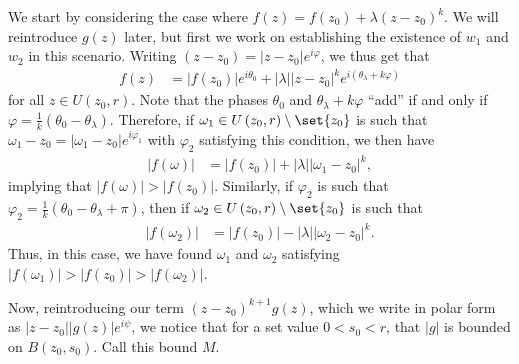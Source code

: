 \documentclass[10pt]{mypackage}
\begin{document}
\begin{solution}
\begin{enumerate}[(a)]
      We start by considering the case where $f(z) = f\left(z_0\right) + \lambda \left( z-z_0 \right)^{k}$. We will reintroduce $g(z)$ later, but first we work on establishing the existence of $w_1$ and $w_2$ in this scenario. Writing $\left( z-z_0 \right) = \left\vert z-z_0 \right\vert e^{i\varphi}$, we thus get that
      \begin{align*}
        f(z) &= \left\vert f\left( z_0 \right) \right\vert e^{i\theta_0} + \left\vert \lambda \right\vert \left\vert z-z_0 \right\vert^{k} e^{i\left( \theta_{\lambda} + k\varphi \right)}
      \end{align*}
      for all $z\in U\left( z_0,r \right)$. Note that the phases $\theta_0$ and $\theta_{\lambda} + k\varphi$ ``add'' if and only if $\varphi = \frac{1}{k} \left( \theta_{0} - \theta_{\lambda} \right)$. Therefore, if $\omega_1\in U\left( z_0,r \right)\setminus \set{z_0}$ is such that $\omega_1 - z_0 = \left\vert \omega_1 - z_0 \right\vert e^{i \varphi_1}$ with $\varphi_2$ satisfying this condition, we then have
      \begin{align*}
        \left\vert f\left( \omega \right) \right\vert &= \left\vert f\left( z_0 \right) \right\vert + \left\vert \lambda \right\vert \left\vert \omega_1 - z_0 \right\vert^{k},
      \end{align*}
      implying that $\left\vert f\left( \omega \right) \right\vert > \left\vert f\left( z_0 \right) \right\vert$. Similarly, if $\varphi_2$ is such that $\varphi_2 = \frac{1}{k} \left( \theta_{0} - \theta_{\lambda} + \pi \right)$, then if $\omega_2\in U\left( z_0,r \right)\setminus \set{z_0}$ is such that 
      \begin{align*}
        \left\vert f\left( \omega_2 \right) \right\vert &= \left\vert f\left( z_0 \right) \right\vert - \left\vert \lambda \right\vert\left\vert \omega_2-z_0 \right\vert^{k}.
      \end{align*}
      Thus, in this case, we have found $\omega_1$ and $\omega_2$ satisfying $\left\vert f\left( \omega_1 \right) \right\vert > \left\vert f\left( z_0 \right) \right\vert > \left\vert f\left( \omega_2 \right) \right\vert$.\newline

      Now, reintroducing our term $\left( z-z_0 \right)^{k+1}g(z)$, which we write in polar form as $\left\vert z-z_0 \right\vert \left\vert g(z) \right\vert e^{i\psi}$, we notice that for a set value $0 < s_0 < r$, that $\left\vert g \right\vert$ is bounded on $B\left( z_0,s_0 \right)$. Call this bound $M$.\newline


\end{enumerate}
\end{solution}
\end{document}
